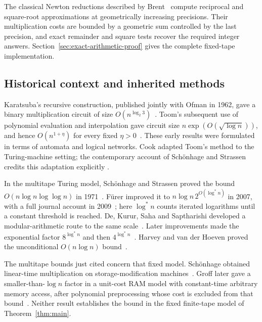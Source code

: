 \documentclass[11pt]{article}
\theoremstyle{definition}
\begin{document}
The classical Newton reductions described by
Brent~\cite[Lemmas 2.1--2.4]{Brent1976} compute reciprocal and
square-root approximations at geometrically increasing precisions.
Their multiplication costs are bounded by a geometric sum controlled by
the last precision, and exact remainder and square tests recover the
required integer answers. Section~\ref{sec:exact-arithmetic-proof}
gives the complete fixed-tape implementation.


\subsection{Historical context and inherited methods}

Karatsuba's recursive construction, published jointly
with Ofman in 1962, gave a binary multiplication circuit of size
$O(n^{\log_2 3})$~\cite{KaratsubaOfman1962}. Toom's subsequent use of polynomial
evaluation and interpolation gave circuit size
$n\exp(O(\sqrt{\log n}))$, and hence $O(n^{1+\eta})$ for every fixed
$\eta>0$~\cite{Toom1963}. These early results were formulated in terms of
automata and logical networks. Cook adapted Toom's method to the
Turing-machine setting; the contemporary account of Sch\"onhage and
Strassen credits this adaptation explicitly
\cite[Section~1, p.~282]{SchonhageStrassen1971}.

In the multitape Turing model,
Sch\"onhage and Strassen proved the bound
$O(n\log n\log\log n)$ in 1971~\cite{SchonhageStrassen1971}.
F\"urer improved it to $n\log n\,2^{O(\log^* n)}$ in 2007, with a full
journal account in 2009~\cite{Furer2007,Furer2009}; here $\log^* n$ counts
iterated logarithms until a constant threshold is reached.
De, Kurur, Saha and Saptharishi developed a modular-arithmetic route to
the same scale~\cite{DeKururSahaSaptharishi2013}.
Later improvements made the exponential factor $8^{\log^* n}$ and then
$4^{\log^* n}$~\cite{HarveyHoevenLecerf2016,HarveyHoeven2019Lattice}.
Harvey and van der Hoeven proved the unconditional
$O(n\log n)$ bound~\cite{HarveyHoeven2021}.

The multitape bounds just cited concern that fixed model. Sch\"onhage obtained
linear-time multiplication on storage-modification machines~\cite{Schonhage1980}.
Groff later gave a smaller-than-$\log n$ factor in a unit-cost RAM model
with constant-time arbitrary memory access, after polynomial preprocessing
whose cost is excluded from that bound~\cite[Sections~2 and~4]{Groff2019}.
Neither result establishes the bound in the fixed finite-tape model of
Theorem~\ref{thm:main}.
\end{document}
